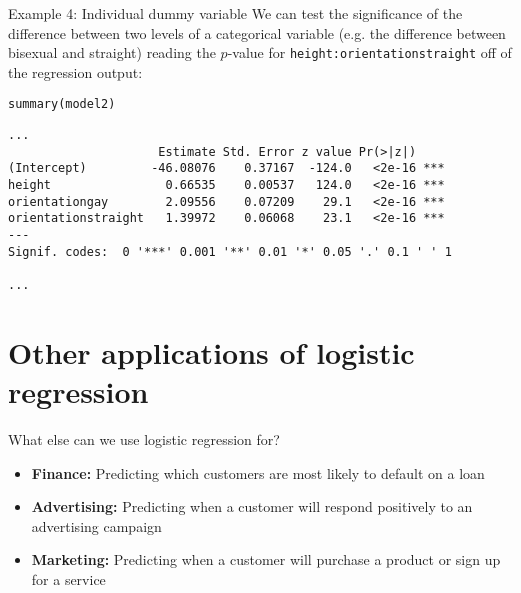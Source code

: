 \documentclass{beamer}\usepackage[]{graphicx}\usepackage[]{color}
\makeatletter
\newcommand{\hlstd}[1]{\textcolor[rgb]{1,0.894,0.769}{#1}}%
\newcommand{\hlkwd}[1]{\textcolor[rgb]{1,0.78,0.769}{#1}}%
\newenvironment{kframe}{%
 \def\at@end@of@kframe{}%
 \ifinner\ifhmode%
  \def\at@end@of@kframe{\end{minipage}}%
  \begin{minipage}{\columnwidth}%
 \fi\fi%
 \def\FrameCommand##1{\hskip\@totalleftmargin \hskip-\fboxsep
 \colorbox{shadecolor}{##1}\hskip-\fboxsep
     \hskip-\linewidth \hskip-\@totalleftmargin \hskip\columnwidth}%
 \MakeFramed {\advance\hsize-\width
   \@totalleftmargin\z@ \linewidth\hsize
   \@setminipage}}%
 {\par\unskip\endMakeFramed%
 \at@end@of@kframe}
\newenvironment{knitrout}{}{} %
\makeatother
\begin{document}
\begin{darkframes}
    \begin{frame}[fragile]{Example 4: Individual dummy variable}
      We can test the significance of the difference between two levels of a categorical variable (e.g. the difference between bisexual and straight) reading the $p$-value for \texttt{height:orientationstraight} off of the regression output:

      \fontvsm
\begin{knitrout}
\begin{kframe}
\begin{alltt}
\hlkwd{summary}\hlstd{(model2)}
\end{alltt}
\begin{verbatim}
...
                     Estimate Std. Error z value Pr(>|z|)    
(Intercept)         -46.08076    0.37167  -124.0   <2e-16 ***
height                0.66535    0.00537   124.0   <2e-16 ***
orientationgay        2.09556    0.07209    29.1   <2e-16 ***
orientationstraight   1.39972    0.06068    23.1   <2e-16 ***
---
Signif. codes:  0 '***' 0.001 '**' 0.01 '*' 0.05 '.' 0.1 ' ' 1

...

\end{verbatim}
\end{kframe}
\end{knitrout}
    \end{frame}

    \section{Other applications of logistic regression}

    \begin{frame}{What else can we use logistic regression for?}
      \begin{itemize}
        \item \textbf{Finance:} Predicting which customers are most likely to default on a loan
        \item \textbf{Advertising:} Predicting when a customer will respond positively to an advertising campaign
        \item \textbf{Marketing:} Predicting when a customer will purchase a product or sign up for a service
      \end{itemize}
    \end{frame}
  \end{darkframes}
\end{document}
